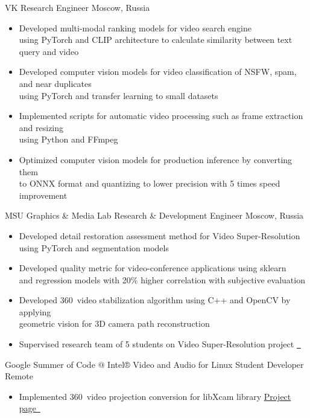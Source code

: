 \documentclass{tccv}
\newcommand{\sphere}{360\textdegree~}
\begin{document}
\begin{eventlist}

     {VK}
     {Research Engineer}
     {Moscow, Russia}
\begin{itemize}
     \item Developed multi-modal ranking models for video search engine \\ using PyTorch and CLIP architecture to calculate similarity between text query and video
     \item Developed computer vision models for video classification of NSFW, spam, and near duplicates \\ using PyTorch and transfer learning to small datasets
     \item Implemented scripts for automatic video processing such as frame extraction and resizing \\ using Python and FFmpeg
     \item Optimized computer vision models for production inference by converting them \\ to ONNX format and quantizing to lower precision with 5 times speed improvement
\end{itemize}

     {MSU Graphics \& Media Lab}
     {Research \& Development Engineer}
     {Moscow, Russia}
\begin{itemize}
     \item Developed detail restoration assessment method for Video Super-Resolution \\ using PyTorch and segmentation models
     \item Developed quality metric for video-conference applications using sklearn \\ and regression models with 20\% higher correlation with subjective evaluation 
     \item Developed \sphere video stabilization algorithm using C++ and OpenCV by applying \\ geometric vision for 3D camera path reconstruction
     \item Supervised research team of 5 students on Video Super-Resolution project \href{https://videoprocessing.ai/benchmarks/video-super-resolution.html}{~\faExternalLink*}
\end{itemize}

     {Google Summer of Code @ Intel® Video and Audio for Linux}
     {Student Developer}
     {Remote}
\begin{itemize}
     \item Implemented \sphere video projection conversion for libXcam library\hfill
     \href{https://unishift.github.io/project/2021-08-20-gsoc-libxcam}{Project page~\faExternalLink*}
\end{itemize}


\end{eventlist}
\end{document}
